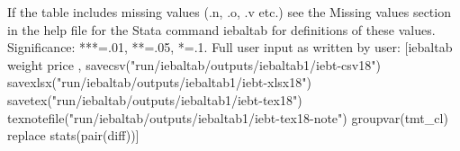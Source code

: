 If the table includes missing values (.n, .o, .v etc.) see the Missing values section in the help file for the Stata command iebaltab for definitions of these values. Significance: ***=.01, **=.05, *=.1. Full user input as written by user: [iebaltab weight price , savecsv("run/iebaltab/outputs/iebaltab1/iebt-csv18") savexlsx("run/iebaltab/outputs/iebaltab1/iebt-xlsx18") savetex("run/iebaltab/outputs/iebaltab1/iebt-tex18") texnotefile("run/iebaltab/outputs/iebaltab1/iebt-tex18-note") groupvar(tmt\_cl) replace stats(pair(diff))] 
